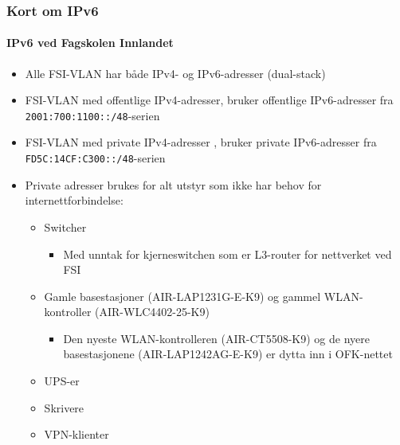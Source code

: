 \begin{frame}%
  \frametitle{Kort om IPv6}
  \framesubtitle{IPv6 ved Fagskolen Innlandet}
  \begin{itemize}[<+->]
  \item Alle FSI-VLAN har både IPv4- og IPv6-adresser (dual-stack)
  \item FSI-VLAN med offentlige IPv4-adresser, bruker offentlige
    IPv6-adresser fra \texttt{2001:700:1100::/48}-serien
  \item FSI-VLAN med private IPv4-adresser , bruker private
    IPv6-adresser fra \texttt{FD5C:14CF:C300::/48}-serien
  \item Private adresser brukes for alt utstyr som ikke har behov for
    internettforbindelse:
    \begin{itemize}[<+->]
    \item Switcher
      \begin{itemize}[<+->]
      \item Med unntak for kjerneswitchen som er L3-router for
        nettverket ved FSI
      \end{itemize}
    \item Gamle basestasjoner (AIR-LAP1231G-E-K9) og gammel
      WLAN-kontroller (AIR-WLC4402-25-K9)
      \begin{itemize}[<+->]
      \item Den nyeste WLAN-kontrolleren (AIR-CT5508-K9) og de nyere
        basestasjonene (AIR-LAP1242AG-E-K9) er dytta inn i OFK-nettet
      \end{itemize}
    \item UPS-er
    \item Skrivere
    \item VPN-klienter
    \end{itemize}
  \end{itemize}
\end{frame}

